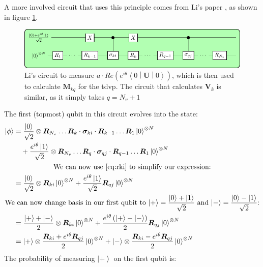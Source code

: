 \documentclass{aux/ttuthes2007}
\newcommand{\ket}[1]{\ensuremath{\left|#1\right\rangle}}
\newcommand{\sandwich}[3]{\left< #1 \middle\vert #2 \middle\vert #3 \right>}
\newcommand{\paren}[1]{\left( #1 \right)}
\newcommand{\elec}{N}
\begin{document}
%
A more involved circuit that uses this principle comes from Li's paper , as shown in figure \ref{fig:circuitbenjamin}.
%
\begin{figure}[h!]
  \includegraphics[width=\linewidth]{circuits/circuit2.pdf}
  \caption[Li's circuit]{Li's circuit to measure $a \cdot Re\paren{e^{i\theta}\sandwich 0 {\bm U} 0}$, which is then used to calculate $\bm M_{kq}$ for the \gls{tdvp}. The circuit that calculates $\bm V_k$ is similar, as it simply takes $q = N_v + 1$}
  \label{fig:circuitbenjamin}
\end{figure}
%
The first (topmost) qubit in this circuit evolves into the state:
%
\begin{equation*}
	\begin{split}
		\ket \phi 
		&= \frac{\ket 0}{\sqrt 2} \otimes \bm R_{N_v} \ldots \bm R_k \cdot \bm \sigma_{ki} \cdot \bm R_{k-1} \ldots \bm R_1 \ket 0^{\otimes \elec}\\
		&\quad + \frac{e^{i\theta}\ket 1}{\sqrt 2} \otimes \bm R_{N_v} \ldots \bm R_q \cdot \bm \sigma_{qj} \cdot \bm R_{q-1} \ldots \bm R_1 \ket 0^{\otimes \elec}\\
		\span\text{We can now use \ref{eq:rki} to simplify our expression:}\\
		&= \frac{\ket 0}{\sqrt 2} \otimes \bm R_{ki} \ket 0^{\otimes \elec}
		+ \frac{e^{i\theta}\ket 1}{\sqrt 2} \bm R_{qj}\ket 0^{\otimes \elec}\\
		\span\text{We can now change basis in our first qubit to
		$\ket + = \frac{\ket 0 + \ket 1}{\sqrt 2}$
		and
		$\ket - = \frac{\ket 0 - \ket 1}{\sqrt 2}$:}\\
		&= \frac{\ket + + \ket -}{2} \otimes \bm R_{ki} \ket 0^{\otimes \elec}
		+ \frac{e^{i\theta}\paren{\ket + - \ket -}}{2} \bm R_{qj}\ket 0^{\otimes \elec}\\
		&= \ket + \otimes \frac{\bm R_{ki} + e^{i\theta}\bm R_{qj}}{2} \ket 0^{\otimes \elec}
		 + \ket - \otimes \frac{\bm R_{ki} - e^{i\theta}\bm R_{qj}}{2} \ket 0^{\otimes \elec}
	\end{split}
\end{equation*}
The probability of measuring $\ket +$ on the first qubit is:
\end{document}
